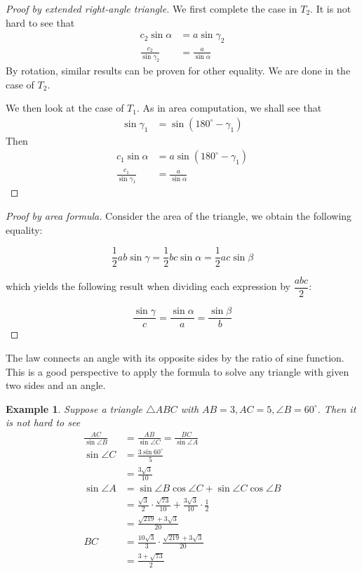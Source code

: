 \documentclass[12pt]{article}
\newtheorem*{example}{Example}
\begin{document}
    \begin{proof}[Proof by extended right-angle triangle]
        We first complete the case in $T_2$. It is not hard to see that \begin{align*}
            c_2\sin{\alpha}&=a\sin{\gamma_2}\\
            \frac{c_2}{\sin{\gamma_2}}&=\frac{a}{\sin{\alpha}}
        \end{align*}
        By rotation, similar results can be proven for other equality. We are done in the case of $T_2$.

        We then look at the case of $T_1$. As in area computation, we shall see that \begin{align*}
            \sin{\gamma_1}&=\sin(180^\circ - \gamma_1)
        \end{align*}
        Then \begin{align*}
            c_1\sin{\alpha}&=a\sin(180^\circ - \gamma_1)\\
            \frac{c_1}{\sin{\gamma_1}}&=\frac{a}{\sin{\alpha}}
        \end{align*}
    \end{proof}

    \begin{proof}[Proof by area formula]
        Consider the area of the triangle, we obtain the following equality:

        $$\frac{1}{2}ab\sin{\gamma}=\frac{1}{2}bc\sin{\alpha}=\frac{1}{2}ac\sin{\beta}$$

        which yields the following result when dividing each expression by $\dfrac{abc}{2}$:

        $$\frac{\sin{\gamma}}{c}=\frac{\sin{\alpha}}{a}=\frac{\sin{\beta}}{b}$$
    \end{proof}

    The law connects an angle with its opposite sides by the ratio of sine function. This is a good perspective to apply the formula to solve any triangle with given two sides and an angle.

    \begin{example}
        Suppose a triangle $\triangle ABC$ with $AB=3, AC=5, \angle B = 60^\circ$. Then it is not hard to see \begin{align*}
            \frac{AC}{\sin{\angle B}}&=\frac{AB}{\sin{\angle C}}=\frac{BC}{\sin{\angle A}}\\
            \sin{\angle C}&=\frac{3\sin{60^\circ}}{5}\\
            &=\frac{3\sqrt{3}}{10}\\
            \sin{\angle A}&=\sin{\angle B}\cos{\angle C}+\sin{\angle C}\cos{\angle B}\\
            &=\frac{\sqrt{3}}{2}\cdot \frac{\sqrt{73}}{10}+\frac{3\sqrt{3}}{10}\cdot \frac{1}{2}\\
            &=\frac{\sqrt{219}+3\sqrt{3}}{20}\\
            BC&=\frac{10\sqrt{3}}{3}\cdot\frac{\sqrt{219}+3\sqrt{3}}{20}\\
            &=\frac{3+\sqrt{73}}{2}
        \end{align*}
    \end{example}
\end{document}

